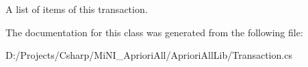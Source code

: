 A list of items of this transaction. 



The documentation for this class was generated from the following file\-:\begin{DoxyCompactItemize}
\item 
D\-:/\-Projects/\-Csharp/\-Mi\-N\-I\-\_\-\-Apriori\-All/\-Apriori\-All\-Lib/Transaction.\-cs\end{DoxyCompactItemize}
